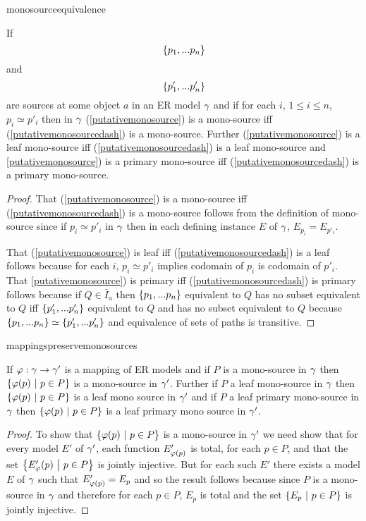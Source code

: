 monosourceequivalence
\begin{lemma}
\label{monosourceequivalence}
If 
\begin{equation}
\label{putativemonosource}
\left\{p_1,...p_n\right\}
\end{equation}
and 
\begin{equation}
\label{putativemonosourcedash}
\left\{p'_1,...p'_n\right\}
\end{equation}
 are sources at some object $a$ in an ER model $\gamma$ and if for each $i$, $1 \leq i \leq n$, $p_i \simeq p'_i$ then in $\gamma$  (\ref{putativemonosource}) is a mono-source iff (\ref{putativemonosourcedash}) is a mono-source.  Further (\ref{putativemonosource}) is a leaf mono-source iff (\ref{putativemonosourcedash}) is a leaf mono-source and \ref{putativemonosource}) is a primary mono-source iff (\ref{putativemonosourcedash}) is a primary mono-source.
\end{lemma}
\begin{proof}
That (\ref{putativemonosource}) is a mono-source iff (\ref{putativemonosourcedash}) is a mono-source follows from the definition of mono-source since if $p_i \simeq p'_i$ in $\gamma$ then in each defining instance $E$ of $\gamma$, $E_{p_i} = E_{p'_i}$.

That (\ref{putativemonosource}) is leaf  iff (\ref{putativemonosourcedash}) is a leaf 
follows because for each $i$, $p_i \simeq p'_i$ implies codomain of $p_i$ is codomain
of $p'_i$.
That \ref{putativemonosource}) is primary  iff (\ref{putativemonosourcedash}) is  primary follows because if $Q \in \bar{I}_a$ then $\left\{p_1,...p_n\right\}$ equivalent to
$Q$ has no  subset equivalent to $Q$ iff $\left\{p'_1,...p'_n\right\}$ equivalent to $Q$ and has no subset equivalent to $Q$ because $\left\{p_1,...p_n\right\} \simeq \left\{p'_1,...p'_n\right\}$
and equivalence of sets of paths is transitive. 
\end{proof}

mappingspreservemonosources
\begin{lemma}
\label{mappingspreservemonosources}
If $\varphi: \gamma \rightarrow \gamma'$ is a mapping of ER models and
if $P$ is a mono-source in $\gamma$ then  
$\left\{\varphi(p) \ \middle|\ p\in P\right\}$ is a mono-source in $\gamma'$. 
Further if $P$ a leaf mono-source in $\gamma$ then $\left\{\varphi(p) \ \middle|\ p\in P\right\}$ is a leaf mono source in $\gamma'$ and if $P$ a leaf primary mono-source in $\gamma$ then $\left\{\varphi(p) \ \middle|\ p\in P\right\}$ is a leaf primary mono source in $\gamma'$.
\end{lemma}
\begin{proof}
To show that $\left\{\varphi(p) \ \middle|\ p\in P\right\}$ is a mono-source in $\gamma'$ we need show that for every model $E'$ of $\gamma'$, 
each function $E'_{\varphi(p)}$ is total, for each $p \in P$, and that the set
$\left\{E'_\varphi(p) \ \middle|\ p \in P\right\}$ is jointly injective. 
 But for each such $E'$ there exists a model $E$ of $\gamma$ such that $E'_{\varphi(p)}=E_{p}$  and so the result follows because since $P$ is a mono-source in $\gamma$ and therefore for each $p \in P$, $E_p$ is total and the set $\left\{E_p \ \middle|\ p\in P\right\}$ is jointly injective.

\end{proof}

